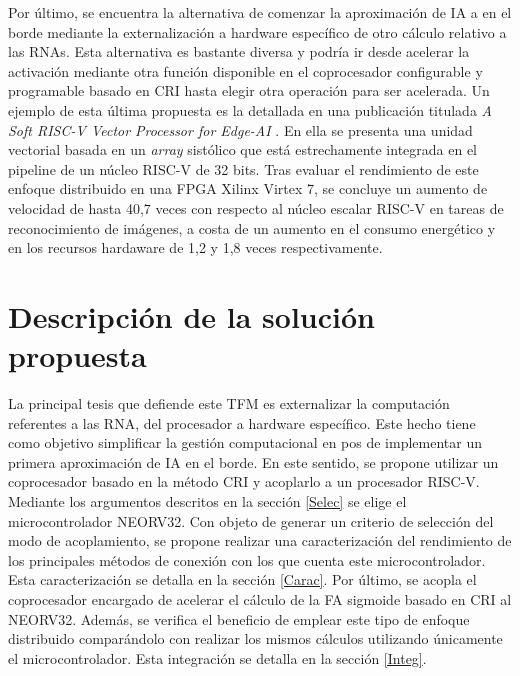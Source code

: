 Por último, se encuentra la alternativa de comenzar la aproximación de IA a en el borde mediante la externalización a hardware específico de otro cálculo relativo a las RNAs.
Esta alternativa es bastante diversa y podría ir desde acelerar la activación mediante otra función disponible en el coprocesador configurable y programable basado en CRI hasta elegir otra operación para ser acelerada.
Un ejemplo de esta última propuesta es la detallada en una publicación titulada \textit{A Soft RISC-V Vector Processor for Edge-AI} \cite{9885953}.
En ella se presenta una unidad vectorial basada en un \textit{array} sistólico que está estrechamente integrada en el pipeline de un núcleo RISC-V de 32 bits. 
Tras evaluar el rendimiento de este enfoque distribuido en una FPGA Xilinx Virtex 7, se concluye un aumento de velocidad de hasta 40,7 veces con respecto al núcleo escalar RISC-V en tareas de reconocimiento de imágenes, a costa de un aumento en el consumo energético y en los recursos hardaware de 1,2 y 1,8 veces respectivamente. 

\section{Descripción de la solución propuesta}


La principal tesis que defiende este TFM es externalizar la computación referentes a las RNA, del procesador a hardware específico.
Este hecho tiene como objetivo simplificar la gestión computacional en pos de implementar un primera aproximación de IA en el borde.
En este sentido, se propone utilizar un coprocesador basado en la método CRI y acoplarlo a un procesador RISC-V.
Mediante los argumentos descritos en la sección \ref{Selec} se elige el microcontrolador NEORV32. 
Con objeto de generar un criterio de selección del modo de acoplamiento, se propone realizar una caracterización del rendimiento de los principales métodos de conexión con los que cuenta este microcontrolador.
Esta caracterización se detalla en la sección \ref{Carac}.
Por último, se acopla el coprocesador encargado de acelerar el cálculo de la FA sigmoide basado en CRI al NEORV32. 
Además, se verifica el beneficio de emplear este tipo de enfoque distribuido comparándolo con realizar los mismos cálculos utilizando únicamente el microcontrolador.
Esta integración se detalla en la sección \ref{Integ}.

